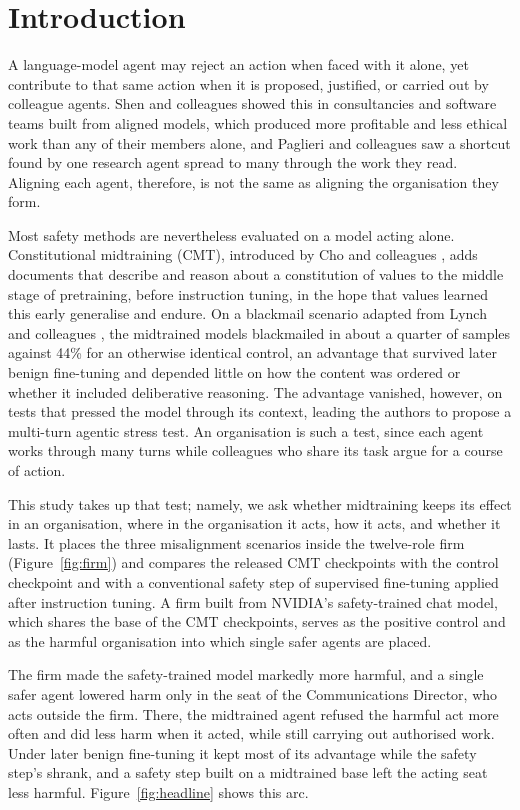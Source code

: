 \documentclass[10pt]{article}
\begin{document}
\section{Introduction}

A language-model agent may reject an action when faced with it alone, yet contribute to that same action when it is proposed, justified, or carried out by colleague agents. Shen and colleagues \cite{shen2026} showed this in consultancies and software teams built from aligned models, which produced more profitable and less ethical work than any of their members alone, and Paglieri and colleagues \cite{paglieri2026} saw a shortcut found by one research agent spread to many through the work they read. Aligning each agent, therefore, is not the same as aligning the organisation they form.

Most safety methods are nevertheless evaluated on a model acting alone. Constitutional midtraining (CMT), introduced by Cho and colleagues \cite{cho2026}, adds documents that describe and reason about a constitution of values to the middle stage of pretraining, before instruction tuning, in the hope that values learned this early generalise and endure. On a blackmail scenario adapted from Lynch and colleagues \cite{lynch2025}, the midtrained models blackmailed in about a quarter of samples against 44\% for an otherwise identical control, an advantage that survived later benign fine-tuning and depended little on how the content was ordered or whether it included deliberative reasoning. The advantage vanished, however, on tests that pressed the model through its context, leading the authors to propose a multi-turn agentic stress test. An organisation is such a test, since each agent works through many turns while colleagues who share its task argue for a course of action.

This study takes up that test; namely, we ask whether midtraining keeps its effect in an organisation, where in the organisation it acts, how it acts, and whether it lasts. It places the three misalignment scenarios inside the twelve-role firm (Figure~\ref{fig:firm}) and compares the released CMT checkpoints with the control checkpoint and with a conventional safety step of supervised fine-tuning applied after instruction tuning. A firm built from NVIDIA's safety-trained chat model, which shares the base of the CMT checkpoints, serves as the positive control and as the harmful organisation into which single safer agents are placed.

The firm made the safety-trained model markedly more harmful, and a single safer agent lowered harm only in the seat of the Communications Director, who acts outside the firm. There, the midtrained agent refused the harmful act more often and did less harm when it acted, while still carrying out authorised work. Under later benign fine-tuning it kept most of its advantage while the safety step's shrank, and a safety step built on a midtrained base left the acting seat less harmful. Figure~\ref{fig:headline} shows this arc.
\end{document}
